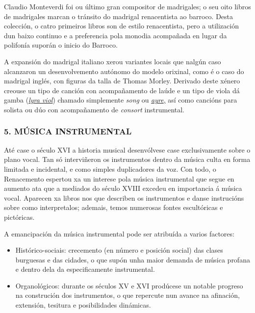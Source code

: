 \documentclass[
]{article}
\begin{document}
Claudio Monteverdi foi ou último gran compositor de madrigales; o seu
oito libros de madrigales marcan o tránsito do madrigal renacentista ao
barroco. Desta colección, o catro primeiros libros son de estilo
renacentista, pero a utilización dun baixo continuo e a preferencia pola
monodia acompañada en lugar da polifonía suporán o inicio do Barroco.

A expansión do madrigal italiano xerou variantes locais que nalgún caso
alcanzaron un desenvolvemento autónomo do modelo orixinal, como é o caso
do madrigal inglés, con figuras da talla de Thomas Morley. Derivado
deste xénero creouse un tipo de canción con acompañamento de laúde e un
tipo de viola dá gamba
(\href{http://en.wikipedia.org/wiki/Lyra_viol}{\emph{lyra viol}})
chamado simplemente \emph{song} ou
\href{http://open.spotify.com/track/2qswQJGVw0CID7luFgs7iA}{\emph{ayre},}
así como cancións para solista ou dúo con acompañamento de
\emph{consort} instrumental.

\hypertarget{5-muxfasica-instrumental}{%
\subsubsection{5. MÚSICA INSTRUMENTAL}\label{5-muxfasica-instrumental}}

Até case o século XVI a historia musical desenvólvese case
exclusivamente sobre o plano vocal. Tan só interviñeron os instrumentos
dentro da música culta en forma limitada e incidental, e como simples
duplicadores da voz. Con todo, o Renacemento espertou xa un interese
pola música instrumental que segue en aumento ata que a mediados do
século XVIII excedeu en importancia á música vocal. Aparecen xa libros
nos que describen os instrumentos e danse instrucións sobre como
interpretalos; ademais, temos numerosas fontes escultóricas e
pictóricas.

A emancipación da música instrumental pode ser atribuída a varios
factores:

\begin{itemize}
\item
  Histórico-sociais: crecemento (en número e posición social) das clases
  burguesas e das cidades, o que supón unha maior demanda de música
  profana e dentro dela da especificamente instrumental.
\item
  Organológicos: durante os séculos XV e XVI prodúcese un notable
  progreso na construción dos instrumentos, o que repercute nun avance
  na afinación, extensión, tesitura e posibilidades dinámicas.
\end{itemize}
\end{document}

